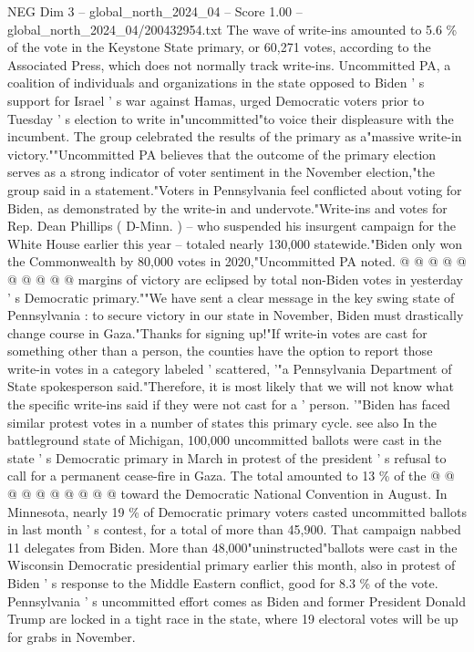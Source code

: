 \begin{textsample}{NEG Dim 3 – global\_north\_2024\_04 – Score 1.00 – global\_north\_2024\_04/200432954.txt}  \label{ex:f3_neg_406}
The wave of write-ins amounted to 5.6 \% of the vote in the Keystone State primary, or 60,271 votes, according to the Associated Press, which does not normally track write-ins.
Uncommitted PA, a coalition of individuals and organizations in the state opposed to Biden ' s support for Israel ' s war against Hamas, urged Democratic voters prior to Tuesday ' s election to write in"uncommitted"to voice their displeasure with the incumbent.
The group celebrated the results of the primary as a"massive write-in victory.""Uncommitted PA believes that the outcome of the primary election serves as a strong indicator of voter sentiment in the November election,"the group said in a statement."Voters in Pennsylvania feel conflicted about voting for Biden, as demonstrated by the write-in and undervote."Write-ins and votes for Rep.
Dean Phillips ( D-Minn. ) -- who suspended his insurgent campaign for the White House earlier this year -- totaled nearly 130,000 statewide."Biden only won the Commonwealth by 80,000 votes in 2020,"Uncommitted PA noted. @ @ @ @ @ @ @ @ @ @ margins of victory are eclipsed by total non-Biden votes in yesterday ' s Democratic primary.""We have sent a clear message in the key swing state of Pennsylvania : to secure victory in our state in November, Biden must drastically change course in Gaza."Thanks for signing up!"If write-in votes are cast for something other than a person, the counties have the option to report those write-in votes in a category labeled ' scattered, '"a Pennsylvania Department of State spokesperson said."Therefore, it is most likely that we will not know what the specific write-ins said if they were not cast for a ' person. '"Biden has faced similar protest votes in a number of states this primary cycle. see also In the battleground state of Michigan, 100,000 uncommitted ballots were cast in the state ' s Democratic primary in March in protest of the president ' s refusal to call for a permanent cease-fire in Gaza.
The total amounted to 13 \% of the @ @ @ @ @ @ @ @ @ @ toward the Democratic National Convention in August.
In Minnesota, nearly 19 \% of Democratic primary voters casted uncommitted ballots in last month ' s contest, for a total of more than 45,900.
That campaign nabbed 11 delegates from Biden.
More than 48,000"uninstructed"ballots were cast in the Wisconsin Democratic presidential primary earlier this month, also in protest of Biden ' s response to the Middle Eastern conflict, good for 8.3 \% of the vote.
Pennsylvania ' s uncommitted effort comes as Biden and former President Donald Trump are locked in a tight race in the state, where 19 electoral votes will be up for grabs in November.

\end{textsample}
